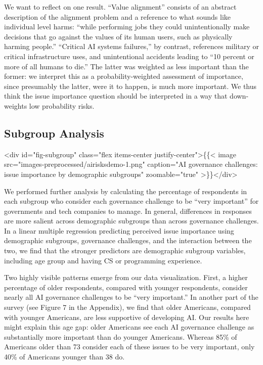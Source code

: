 \documentclass{article}
\begin{document}
We want to reflect on one result. ``Value alignment'' consists of an abstract description of the alignment problem and a reference to what sounds like individual level harms: ``while performing jobs they could unintentionally make decisions that go against the values of its human users, such as physically harming people.'' ``Critical AI systems failures,'' by contrast, references military or critical infrastructure uses, and unintentional accidents leading to ``10 percent or more of all humans to die.'' The latter was weighted as less important than the former: we interpret this as a probability-weighted assessment of importance, since presumably the latter, were it to happen, is much more important. We thus think the issue importance question should be interpreted in a way that down-weights low probability risks. 

\subsection{Subgroup Analysis}

<div id="fig-subgroup" class="flex items-center justify-center">\{\{< image src="images-preprocessed/airisksdemo-1.png" caption="AI governance challenges: issue importance by demographic subgroups" zoomable="true" >\}\}</div>



We performed further analysis by calculating the percentage of respondents in each subgroup who consider each governance challenge to be ``very important'' for governments and tech companies to manage. In general, differences in responses are more salient across demographic subgroups than across governance challenges. In a linear multiple regression predicting perceived issue importance using demographic subgroups, governance challenges, and the interaction between the two, we find that the stronger predictors are demographic subgroup variables, including age group and having CS or programming experience.

Two highly visible patterns emerge from our data visualization. First, a higher percentage of older respondents, compared with younger respondents, consider nearly all AI governance challenges to be ``very important.'' In another part of the survey (see Figure 7 in the Appendix), we find that older Americans, compared with younger Americans, are less supportive of developing AI. Our results here might explain this age gap: older Americans see each AI governance challenge as substantially more important than do younger Americans. Whereas 85\% of Americans older than 73 consider each of these issues to be very important, only 40\% of Americans younger than 38 do.
\end{document}
